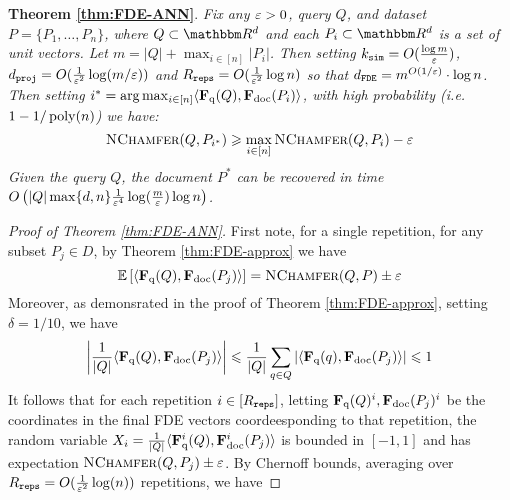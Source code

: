 \textbf{Theorem \ref{thm:FDE-ANN}}. {\it
Fix any $\varepsilon > 0$, query $Q$, and dataset $P = \{P_1,\dots,P_n\}$, where $Q \subset \R^d$ and each $P_i \subset \R^d$ is a set of unit vectors. Let $m=|Q| + \max_{i \in [n]}|P_i|$. 
Then setting $k_{\texttt{sim}} = O(\frac{\log m}{\varepsilon})$, $d_{\texttt{proj}} = O(\frac{1}{\varepsilon^2} \log (m/\varepsilon))$ and $R_{\texttt{reps}} = O(\frac{1}{\varepsilon^2}\log n)$ so that $d_{\texttt{FDE}} =  m^{O(1/\varepsilon)} \cdot  \log n$. Then setting $i^* = \arg \max_{i \in [n]}\langle \mathbf{F}_{\text{q}}(Q) , \mathbf{F}_{\text{doc}}(P_i) \rangle$, with high probability (i.e. $1-1/\operatorname{poly}(n)$) we have:
\[ \textsc{NChamfer}(Q,P_{i^*}) \geqslant \max_{i \in [n]} \textsc{NChamfer}(Q,P_i) - \varepsilon \]
Given the query $Q$, the document $P^*$ can be recovered in time $O\left(|Q| \max\{d,n\}  \frac{1}{\varepsilon^4} \log(\frac{m}{\varepsilon}) \log n \right)$. 
}
\begin{proof}[Proof of Theorem \ref{thm:FDE-ANN}]
First note, for a single repetition, for any subset $P_j \in D$, by Theorem \ref{thm:FDE-approx} we have
\[\mathop{ \mathbb{E}\left[ \langle \mathbf{F}_{\text{q}}(Q) , \mathbf{F}_{\text{doc}}(P_j) \rangle \right]} = \textsc{NChamfer}(Q,P) \pm \varepsilon \]
Moreover, as demonsrated in the proof of Theorem  \ref{thm:FDE-approx}, setting $\delta = 1/10$, we have 
\[\left|\frac{1}{|Q|}\langle \mathbf{F}_{\text{q}}(Q) , \mathbf{F}_{\text{doc}}(P_j) \rangle\right| \leqslant \frac{1}{|Q|}\sum_{q \in Q} \left|\langle \mathbf{F}_{\text{q}}(q) , \mathbf{F}_{\text{doc}}(P_j) \rangle \right| \leqslant 1\]
It follows that for each repetition $i \in [R_{\texttt{reps}}]$, letting $\mathbf{F}_{\text{q}}(Q)^i , \mathbf{F}_{\text{doc}}(P_j)^i$ be the coordinates in the final FDE vectors coordeesponding to that repetition, the random variable $X_i = \frac{1}{|Q|}\langle \mathbf{F}_{\text{q}}^i(Q) , \mathbf{F}_{\text{doc}}^i(P_j)\rangle$ is bounded in $[-1,1]$ and has expectation $\textsc{NChamfer}(Q,P_j) \pm \varepsilon$. By Chernoff bounds, averaging over  $R_{\texttt{reps}} = O(\frac{1}{\varepsilon^2}\log(n))$ repetitions, we have 


\end{proof}
